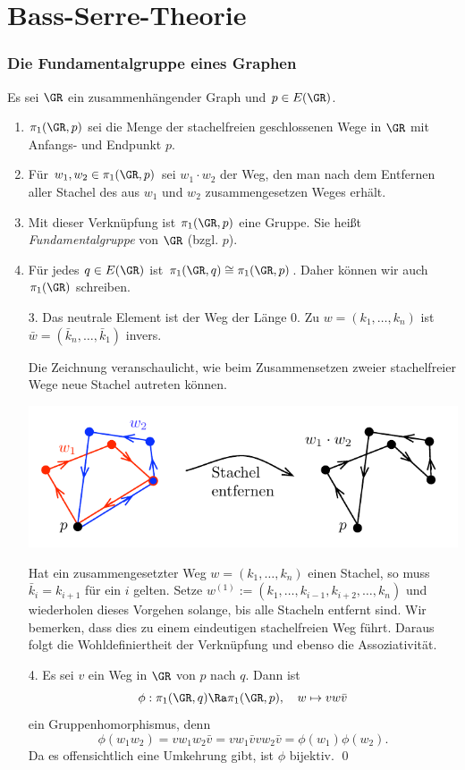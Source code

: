 \part{Bass-Serre-Theorie}

\section{Die Fundamentalgruppe eines Graphen}\label{sec_FG}

\DB Es sei $\GR$ ein zusammenhängender Graph und $p\in E(\GR)$.
\begin{enumerate}
\item $\pi_1(\GR,p)$ sei die Menge der stachelfreien geschlossenen
Wege in $\GR$ mit Anfangs- und Endpunkt $p$.
\item Für $w_1, w_2\in \pi_1(\GR,p)$ sei $w_1\cdot w_2$ der
Weg, den man nach dem Entfernen aller Stachel des aus $w_1$ und $w_2$
zusammengesetzen Weges erhält.
\item Mit dieser Verknüpfung ist $\pi_1(\GR,p)$ eine Gruppe.
Sie heißt \emph{Fundamentalgruppe}
von $\GR$ (bzgl. $p$).
\item Für jedes $q\in E(\GR)$ ist $\pi_1(\GR,q)\cong\pi_1(\GR,p)$.
Daher können wir auch $\pi_1(\GR)$ schreiben.
\end{enumerate}
\bew
\begin{itemize}
\item[3.] Das neutrale Element ist der Weg der Länge $0$.
Zu $w=(k_1,\ldots,k_n)$ ist
$\bar{w}=(\bar{k}_n,\ldots,\bar{k}_1)$ invers.

Die Zeichnung veranschaulicht, wie beim Zusammensetzen zweier
stachelfreier Wege neue Stachel autreten können.
\begin{center}
	\includegraphics{grugraImages/w1w2}
\end{center}
Hat ein zusammengesetzter Weg $w=(k_1,\ldots,k_n)$ einen Stachel,
so muss $\bar{k}_i=k_{i+1}$ für ein $i$ gelten.
Setze $w^{(1)}:=(k_1,\ldots,k_{i-1},k_{i+2},\ldots,k_n)$ und
wiederholen dieses Vorgehen solange, bis alle Stacheln entfernt sind.
Wir bemerken, dass dies zu einem eindeutigen stachelfreien Weg führt.
Daraus folgt die Wohldefiniertheit der Verknüpfung und ebenso die
Assoziativität.
\item[4.] Es sei $v$ ein Weg in $\GR$ von $p$ nach $q$. Dann ist
\[
\phi:\pi_1(\GR,q)\Ra\pi_1(\GR,p),\quad
w\mapsto vw\bar{v}
\]
ein Gruppenhomorphismus, denn
\[
\phi(w_1 w_2) = v w_1 w_2 \bar{v}
=v w_1 \bar{v} v w_2 \bar{v}
=\phi(w_1)\phi(w_2).
\]
Da es offensichtlich eine Umkehrung gibt, ist $\phi$ bijektiv.
\qed
\end{itemize}


